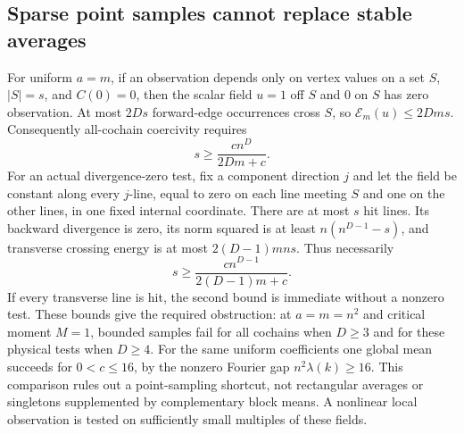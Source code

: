 \documentclass[11pt]{article}
\newcommand{\E}{\mathcal E}
\begin{document}
\subsection{Sparse point samples cannot replace stable averages}
For uniform $a=m$, if an observation depends only on vertex values on a set $S$, $|S|=s$, and
$C(0)=0$, then the scalar field $u=1$ off $S$ and $0$ on $S$ has zero observation.
At most $2Ds$ forward-edge occurrences cross $S$, so
$\E_m(u)\leq2Dm s$. Consequently all-cochain coercivity requires
\[
 s\geq\frac{cn^D}{2Dm+c}.
\]
For an actual divergence-zero test, fix a component direction $j$ and let the field
be constant along every $j$-line, equal to zero on each line meeting $S$ and one on
the other lines, in one fixed internal coordinate. There are at most $s$ hit lines.
Its backward divergence is zero, its norm squared is at least
$n(n^{D-1}-s)$, and transverse crossing energy is at most $2(D-1)mns$.
Thus necessarily
\[
 s\geq\frac{cn^{D-1}}{2(D-1)m+c}.
\]
If every transverse line is hit, the second bound is immediate without a nonzero test. These bounds give the required obstruction:
at $a=m=n^2$ and critical moment $M=1$, bounded samples fail for all cochains
when $D\geq3$ and for these physical tests when $D\geq4$.
For the same uniform coefficients one global mean succeeds for $0<c\leq16$,
by the nonzero Fourier gap $n^2\lambda(k)\geq16$.
This comparison rules out a point-sampling shortcut, not rectangular averages or
singletons supplemented by complementary block means. A nonlinear local observation
is tested on sufficiently small multiples of these fields.


\end{document}
